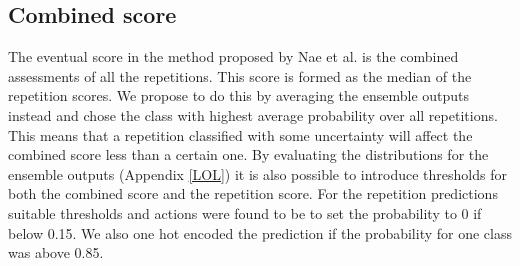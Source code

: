
\subsection{Combined score} \label{sec:met-combined}
The eventual score in the method proposed by Nae et al. \cite{Nae2020b} is the combined assessments of all the repetitions. This score is formed as the median of the repetition scores. We propose to do this by averaging the ensemble outputs instead and chose the class with highest average probability over all repetitions. This means that a repetition classified with some uncertainty will affect the combined score less than a certain one. By evaluating the distributions for the ensemble outputs (Appendix \ref{LOL}) it is also possible to introduce thresholds for both the combined score and the repetition score. For the repetition predictions suitable thresholds and actions were found to be to set the probability to 0 if below 0.15. We also one hot encoded the prediction if the probability for one class was above 0.85.
